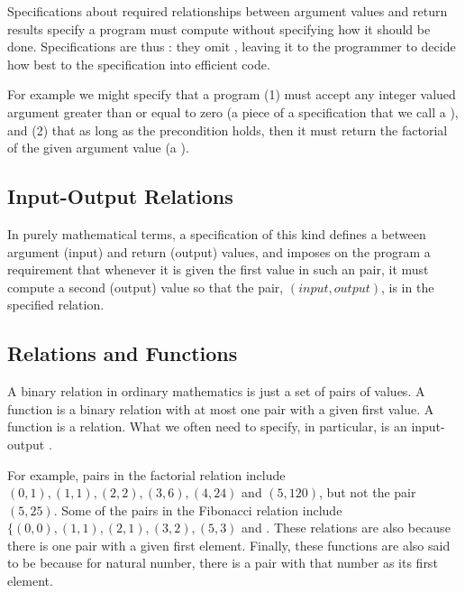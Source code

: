 \documentclass[letterpaper,10pt,english]{sphinxmanual}
\begin{document}
Specifications about required relationships between argument values
and return results specify  a program must compute without
specifying how it should be done. Specifications are thus :
they omit , leaving it to the programmer to
decide how best to  the specification into efficient code.

For example we might specify that a program (1) must accept any
integer valued argument greater than or equal to zero (a piece of a
specification that we call a ), and (2) that as long as
the precondition holds, then it must return the factorial of the given
argument value (a ).


\subsection{Input-Output Relations}
\label{\detokenize{05-verifying-logical-specifications:input-output-relations}}
In purely mathematical terms, a specification of this kind defines a
 between argument (input) and return (output) values,
and imposes on the program a requirement that whenever it is given the
first value in such an  pair, it must compute a second
(output) value so that the pair, \((input, output)\), is in the
specified relation.


\subsection{Relations and Functions}
\label{\detokenize{05-verifying-logical-specifications:relations-and-functions}}
A binary relation in ordinary mathematics is just a set of pairs of
values. A function is a binary relation with at most one pair with a
given first value. A function is a  relation. What we
often need to specify, in particular, is an input-output .

For example, pairs in the factorial relation include \((0,1),
(1,1), (2,2), (3,6), (4,24)\) and \((5,120)\), but not the pair
\((5,25)\). Some of the pairs in the Fibonacci relation include
\(\{ (0,0), (1,1), (2,1), (3,2), (5,3)\) and . These
relations are also  because there is  one pair
with a given first element. Finally, these functions are also said to
be  because for  natural number, there is a pair with
that number as its first element.
\end{document}
